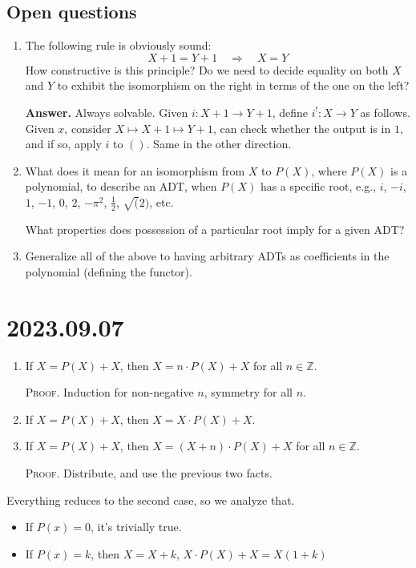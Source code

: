 \documentclass[letterpaper,numbers=enddot]{scrartcl}
\newcommand{\then}{\quad\mathrel{\Longrightarrow}\quad}
\begin{document}
\subsection{Open questions}

\begin{enumerate}
  \item The following rule is obviously sound:
  \[ X+1 = Y+1 \then X=Y \]
  How constructive is this principle?
  Do we need to decide equality on both $X$ and $Y$ to exhibit the
  isomorphism on the right in terms of the one on the left?

  \textbf{Answer.}
  Always solvable.  Given $i : X+1 \to Y+1$, define $i^! :X \to Y$ as follows.
  Given $x$, consider $X \mapsto X+1 \mapsto Y+1$, can check whether the output is in $1$, and if so,
  apply $i$ to $()$.  Same in the other direction.

  \item What does it mean for an isomorphism from $X$ to $P(X)$, where $P(X)$
  is a polynomial, to describe an ADT, when $P(X)$ has a specific root,
  e.g., $i$, $-i$, $1$, $-1$, $0$, $2$, $-\pi^2$, $\frac{1}{2}$, $\sqrt(2)$, etc.

  What properties does possession of a particular root imply for a given ADT?

  \item Generalize all of the above to having arbitrary ADTs as coefficients
  in the polynomial (defining the functor).

\end{enumerate}

\section{2023.09.07}
\begin{enumerate}
  \item If $X = P(X) + X$, then $X = n \cdot P(X) + X$ for all $n \in \mathbb{Z}$.

  \textsc{Proof.} Induction for non-negative $n$, symmetry for all $n$.

  \item If $X = P(X) + X$, then $X = X \cdot P(X) + X$.

  \item If $X = P(X) + X$, then $X = (X+n)\cdot P(X) + X$ for all $n \in \mathbb{Z}$.

  \textsc{Proof.} Distribute, and use the previous two facts.
\end{enumerate}

Everything reduces to the second case, so we analyze that.
\begin{itemize}
  \item If $P(x)=0$, it's trivially true.
  \item If $P(x) = k$, then $X = X + k$, $X \cdot P(X) + X = X (1 + k)$
\end{itemize}
\end{document}
